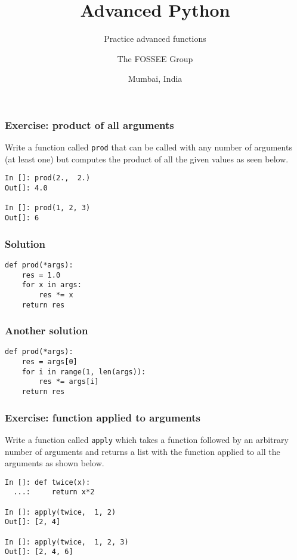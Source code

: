 \documentclass[14pt,compress,aspectratio=169]{beamer}
\title[Practice advanced functions]{Advanced Python}
\subtitle{Practice advanced functions}
\author[FOSSEE] {The FOSSEE Group}
\institute[IIT Bombay] {Department of Aerospace Engineering\\IIT Bombay}
\date[] {Mumbai, India}
\begin{document}
\begin{frame}
  \titlepage
\end{frame}

\begin{frame}
  \frametitle{Exercise: product of all arguments}
  \begin{block}{}
    Write a function called \lstinline{prod} that can be called with any
    number of arguments (at least one) but computes the product of all the
    given values as seen below.
  \end{block}

\begin{lstlisting}
In []: prod(2.,  2.)
Out[]: 4.0

In []: prod(1, 2, 3)
Out[]: 6
\end{lstlisting}
\end{frame}

\begin{frame}
  \frametitle{Solution}
\begin{lstlisting}
def prod(*args):
    res = 1.0
    for x in args:
        res *= x
    return res

\end{lstlisting}
\end{frame}

\begin{frame}
  \frametitle{Another solution}
\begin{lstlisting}
def prod(*args):
    res = args[0]
    for i in range(1, len(args)):
        res *= args[i]
    return res

\end{lstlisting}
\end{frame}


\begin{frame}
  \frametitle{Exercise: function applied to arguments}
  \begin{block}{}
    Write a function called \lstinline{apply} which takes a function followed
    by an arbitrary number of arguments and returns a list with the function
    applied to all the arguments as shown below.
  \end{block}

\begin{lstlisting}
In []: def twice(x):
  ...:     return x*2

In []: apply(twice,  1, 2)
Out[]: [2, 4]

In []: apply(twice,  1, 2, 3)
Out[]: [2, 4, 6]

\end{lstlisting}
\end{frame}
\end{document}
